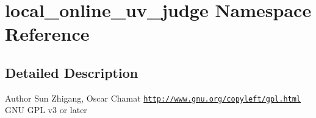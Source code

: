 \hypertarget{namespacelocal__online__uv__judge}{\section{local\-\_\-online\-\_\-uv\-\_\-judge Namespace Reference}
\label{namespacelocal__online__uv__judge}
}


\subsection{Detailed Description}
\begin{DoxyAuthor}{Author}
Sun Zhigang, Oscar Chamat  \href{http://www.gnu.org/copyleft/gpl.html}{\tt http\-://www.\-gnu.\-org/copyleft/gpl.\-html} G\-N\-U G\-P\-L v3 or later 
\end{DoxyAuthor}
